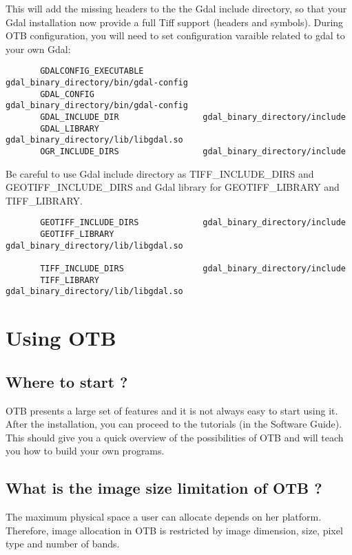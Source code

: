 This will add the missing headers to the the Gdal include directory, so that your Gdal installation now provide a full Tiff support (headers and symbols). During OTB configuration, you will need to set configuration varaible related to gdal to your own Gdal:
\begin{verbatim}
       GDALCONFIG_EXECUTABLE            gdal_binary_directory/bin/gdal-config                 
       GDAL_CONFIG                      gdal_binary_directory/bin/gdal-config                 
       GDAL_INCLUDE_DIR                 gdal_binary_directory/include                         
       GDAL_LIBRARY                     gdal_binary_directory/lib/libgdal.so 
       OGR_INCLUDE_DIRS                 gdal_binary_directory/include  
\end{verbatim}
Be careful to use Gdal include directory as TIFF\_INCLUDE\_DIRS and GEOTIFF\_INCLUDE\_DIRS and Gdal library for GEOTIFF\_LIBRARY and TIFF\_LIBRARY.   
\begin{verbatim}
       GEOTIFF_INCLUDE_DIRS             gdal_binary_directory/include                         
       GEOTIFF_LIBRARY                  gdal_binary_directory/lib/libgdal.so 
            
       TIFF_INCLUDE_DIRS                gdal_binary_directory/include                         
       TIFF_LIBRARY                     gdal_binary_directory/lib/libgdal.so
\end{verbatim}              

\section{Using OTB}

\subsection{Where to start ?}

OTB presents a large set of features and it is not always easy to start using it.
After the installation, you can proceed to the tutorials (in the Software Guide).
This should give you a quick overview of the possibilities of OTB and will teach
you how to build your own programs.

\subsection{What is the image size limitation of OTB ?}

The maximum physical space a user can allocate depends on her platform. Therefore,
image allocation in OTB is restricted by image dimension, size, pixel type and number
of bands.

